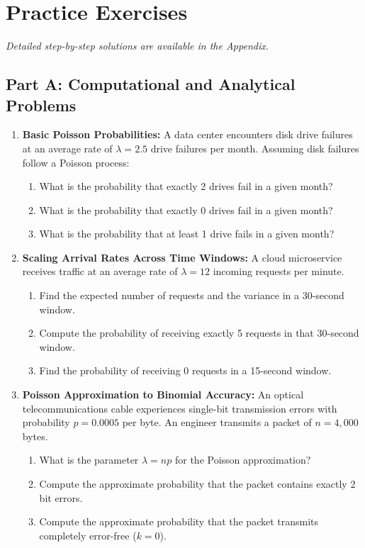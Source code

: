 \newpage
\section{Practice Exercises}
\textit{Detailed step-by-step solutions are available in the Appendix.}

\subsection*{Part A: Computational and Analytical Problems}

\begin{enumerate}
    \item \textbf{Basic Poisson Probabilities:} A data center encounters disk drive failures at an average rate of $\lambda = 2.5$ drive failures per month. Assuming disk failures follow a Poisson process:
    \begin{enumerate}
        \item What is the probability that exactly 2 drives fail in a given month?
        \item What is the probability that exactly 0 drives fail in a given month?
        \item What is the probability that at least 1 drive fails in a given month?
    \end{enumerate}

    \item \textbf{Scaling Arrival Rates Across Time Windows:} A cloud microservice receives traffic at an average rate of $\lambda = 12$ incoming requests per minute.
    \begin{enumerate}
        \item Find the expected number of requests and the variance in a 30-second window.
        \item Compute the probability of receiving exactly 5 requests in that 30-second window.
        \item Find the probability of receiving 0 requests in a 15-second window.
    \end{enumerate}

    \item \textbf{Poisson Approximation to Binomial Accuracy:} An optical telecommunications cable experiences single-bit transmission errors with probability $p = 0.0005$ per byte. An engineer transmits a packet of $n = 4{,}000$ bytes.
    \begin{enumerate}
        \item What is the parameter $\lambda = np$ for the Poisson approximation?
        \item Compute the approximate probability that the packet contains exactly 2 bit errors.
        \item Compute the approximate probability that the packet transmits completely error-free ($k = 0$).
    \end{enumerate}


\end{enumerate}
